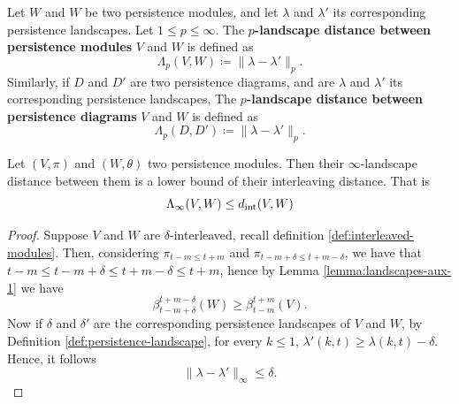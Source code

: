\begin{definition}
    Let $ W $ and $ W $ be two persistence modules, and let $ \lambda $ and $ \lambda' $ its corresponding persistence landscapes. Let $ 1 \leq p \leq \infty $. The {\bf $p$-landscape distance between persistence modules} $ V $ and $ W $ is defined as
    \begin{equation}
        \Lambda_p(V, W) \coloneq \|\lambda - \lambda' \|_p.
    \end{equation}
    Similarly, if $ D $ and $ D' $ are two persistence diagrams, and are $ \lambda $ and $ \lambda' $ its corresponding persistence landscapes, The {\bf $p$-landscape distance between persistence diagrams} $ V $ and $ W $ is defined as
    \begin{equation}
        \Lambda_p(D, D') \coloneq \|\lambda - \lambda' \|_p.
    \end{equation}
\end{definition}

\begin{theorem} \label{theorem:landscapes-aux}
    Let $ (V, \pi) $ and $ (W, \theta) $ two persistence modules. Then their $\infty$-landscape distance between them is a lower bound of their interleaving distance. That is
    \begin{equation}
        \Lambda_{\infty}(V, W) \leq d_{\operatorname{int}}(V, W)
    \end{equation}
\end{theorem}
\begin{proof}
    Suppose $ V $ and $ W $ are $\delta$-interleaved, recall definition \ref{def:interleaved-modules}. Then, considering $ \pi_{t-m \leq t+m} $ and $ \pi_{t-m + \delta \leq t+m - \delta } $, we have that $ t-m \leq t-m + \delta \leq t+m - \delta \leq t+m $, hence by Lemma \ref{lemma:landscapes-aux-1} we have
    \begin{equation}
        \beta_{t-m+\delta}^{t+m-\delta}(W) \geq \beta_{t-m}^{t+m}(V).
    \end{equation}
    Now if $ \delta $ and $ \delta' $ are the corresponding persistence landscapes of $ V $ and $ W $, by Definition \ref{def:persistence-landscape}, for every $ k \leq 1 $, $ \lambda'(k, t) \geq \lambda(k, t) - \delta $. Hence, it follows
    \begin{equation}
        \|\lambda - \lambda'\|_\infty \leq \delta.
    \end{equation}
\end{proof}

